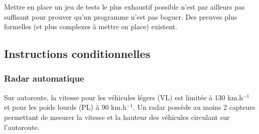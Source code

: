 \documentclass[a4paper,10pt]{report}
\theoremstyle{exo}
\theoremstyle{exercice}
\begin{document}
\medskip
Mettre en place un jeu de tests le plus exhaustif possible n'est par ailleurs pas suffisant pour prouver qu'un programme n'est pas boguer. Des preuves plus formelles (et plus complexes à mettre en place) existent.

\newpage
\subsection{Instructions conditionnelles}

\subsubsection{Radar automatique}

Sur autoroute, la vitesse pour les véhicules légers (VL) est limitée à 130 km.h$^{-1}$ et pour les poids lourds (PL) à 90 km.h$^{-1}$. Un radar possède au moins 2 capteurs permettant de mesurer la vitesse et la hauteur des véhicules circulant sur l'autoroute.
\end{document}
